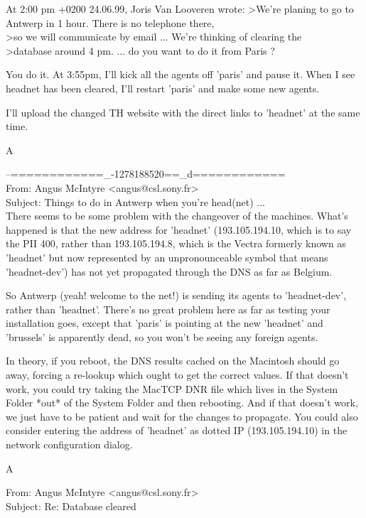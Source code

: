 {\begin{mail}
At 2:00 pm +0200 24.06.99, Joris Van Looveren wrote:
>We're planing to go to Antwerp in 1 hour. There is no telephone there,
\\>so we will communicate by email ... We're thinking of clearing the 
\\>database around 4 pm. ... do you want to do it from Paris ?

You do it. At 3:55pm, I'll kick all the agents off 'paris' and pause it. 
When I see headnet has been cleared, I'll restart 'paris' and make 
some new agents.

I'll upload the changed TH website with the direct links to 'headnet' 
at the same time.

		A
\end{mail}
\begin{mail}
--============\_-1278188520==\_d============\\
From: Angus McIntyre <angus@csl.sony.fr>\\
Subject: Things to do in Antwerp when you're head(net) ...\\

There seems to be some problem with the changeover of the machines. 
What's happened is that the new address for 'headnet' (193.105.194.10, 
which is to say the PII 400, rather than 193.105.194.8, which is 
the Vectra formerly known as 'headnet' but now 
represented by an unpronounceable symbol that means 'headnet-dev') has not 
yet propagated through the DNS as far as Belgium.

So Antwerp (yeah! welcome to the net!) is sending its agents to 'headnet-dev', 
rather than 'headnet'. There's no great problem here as far as testing your 
installation goes, except that 'paris' is pointing at the new 'headnet' and 
'brussels' is apparently dead, so you won't be seeing any foreign agents.

In theory, if you reboot, the DNS results cached on the Macintosh should go 
away, forcing a re-lookup which ought to get the correct values. If that 
doesn't work, you could try taking the MacTCP DNR file which lives in the 
System Folder *out* of the System Folder and then rebooting. And if that 
doesn't work, we just have to be patient and wait for the changes to propagate. 
You could also consider entering the address of 'headnet' as dotted IP 
(193.105.194.10) in the network configuration dialog.

	A
\end{mail}
\begin{mail}
From: Angus McIntyre <angus@csl.sony.fr>\\
Subject: Re: Database cleared\\


\end{mail}}
